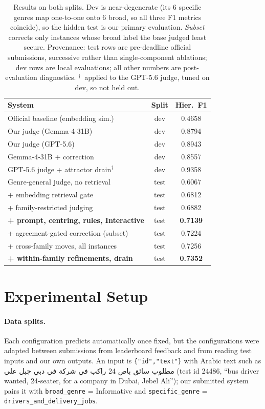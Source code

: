 \documentclass[11pt]{article}
\newcommand{\ar}[1]{\textarabic{#1}}
\begin{document}
\begin{table}[t]
\centering\small
\setlength{\tabcolsep}{4pt}
\begin{tabular}{lcc}
\toprule
System & Split & Hier.\ F1 \\
\midrule
Official baseline (embedding sim.) & dev & 0.4658 \\
Our judge (Gemma-4-31B) & dev & 0.8794 \\
Our judge (GPT-5.6) & dev & 0.8943 \\
\quad Gemma-4-31B + correction & dev & 0.8557 \\
GPT-5.6 judge + attractor drain$^{\dagger}$ & dev & 0.9358 \\
\midrule
Genre-general judge, no retrieval & test & 0.6067 \\
\quad + embedding retrieval gate & test & 0.6812 \\
\quad + family-restricted judging & test & 0.6882 \\
\textbf{\; + prompt, centring, rules, Interactive} & test & \textbf{0.7139} \\
\quad + agreement-gated correction (subset) & test & 0.7224 \\
\quad + cross-family moves, all instances & test & 0.7256 \\
\textbf{\; + within-family refinements, drain} & test & \textbf{0.7352} \\
\bottomrule
\end{tabular}
\caption{Results on both splits. Dev is near-degenerate (its 6 specific genres map
one-to-one onto 6 broad, so all three F1 metrics coincide), so the hidden test is our primary
evaluation. \emph{Subset} corrects only instances whose broad label the base judged least
secure. Provenance: test rows are pre-deadline official submissions, successive rather than
single-component ablations; dev rows are local evaluations; all other numbers are
post-evaluation diagnostics. $^{\dagger}$~applied to the GPT-5.6 judge, tuned on dev, so not held out.}
\label{tab:ablation}
\end{table}
\section{Experimental Setup}
\label{sec:setup}
\paragraph{Data splits.} Each configuration predicts automatically once fixed, but the
configurations were adapted between submissions from leaderboard feedback and from reading test
inputs and our own outputs. An input is \texttt{\{"id","text"\}} with Arabic text such as
\ar{مطلوب سائق باص 24 راكب في شركة في دبي جبل علي} (test id 24486,
``bus driver wanted, 24-seater, for a company in Dubai, Jebel Ali''); our submitted system pairs
it with \texttt{broad\_genre} = Informative and \texttt{specific\_genre} =
\texttt{drivers\_and\_}\texttt{delivery\_jobs}.
\end{document}
